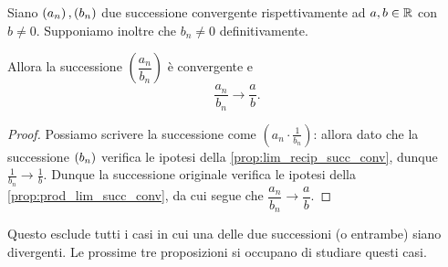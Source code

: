 \begin{proposition}
     \label{prop:rapp_lim_succ_conv}
    Siano $\seqn*{a}, \seqn*{b}$ due successione convergente rispettivamente ad $a, b \in \mathbb{R}$ con $b \neq 0$. Supponiamo inoltre che $b_n \neq 0$ definitivamente.

    Allora la successione $\left(\dfrac{a_n}{b_n}\right)$ è convergente e \[
        \frac{a_n}{b_n} \to \frac{a}{b}.    
    \]
\end{proposition}
\begin{proof}
    Possiamo scrivere la successione come $\left(a_n \cdot \frac{1}{b_n}\right)$: allora dato che la successione $\seqn*{b}$ verifica le ipotesi della \autoref{prop:lim_recip_succ_conv}, dunque $\frac{1}{b_n} \to \frac1b$. Dunque la successione originale verifica le ipotesi della \autoref{prop:prod_lim_succ_conv}, da cui segue che $\dfrac{a_n}{b_n} \to \dfrac{a}{b}$.
\end{proof}

Questo esclude tutti i casi in cui una delle due successioni (o entrambe) siano divergenti. Le prossime tre proposizioni si occupano di studiare questi casi.

